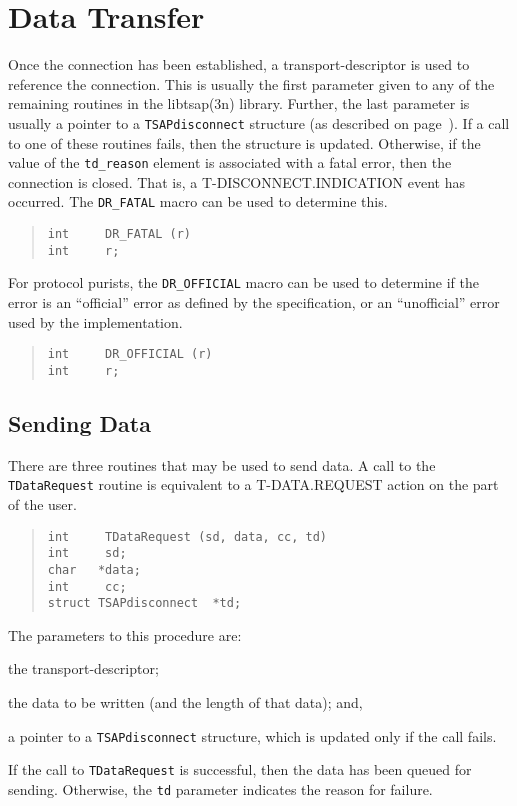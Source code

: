 \section	{Data Transfer}
Once the connection has been established,
a transport-descriptor is used to reference the connection.
This is usually the first parameter given to any of the remaining routines in
the \man libtsap(3n) library.
Further,
the last parameter is usually a pointer to a \verb"TSAPdisconnect" structure
(as described on page~\pageref{TSAPdisconnect}).
If a call to one of these routines fails,
then the structure is updated.
Otherwise, if the value of the \verb"td_reason" element is associated with a
fatal error, then the connection is closed.
That is, a {\sf T-DISCONNECT.INDICATION\/} event has occurred.
The \verb"DR_FATAL" macro can be used to determine this.
\begin{quote}\small\begin{verbatim}
int     DR_FATAL (r)
int     r;
\end{verbatim}\end{quote}
For protocol purists,
the \verb"DR_OFFICIAL" macro can be used to determine if the error is an
``official'' error as defined by the specification,
or an ``unofficial'' error used by the implementation.
\begin{quote}\small\begin{verbatim}
int     DR_OFFICIAL (r)
int     r;
\end{verbatim}\end{quote}

\subsection	{Sending Data}
There are three routines that may be used to send data.
A call to the \verb"TDataRequest" routine is equivalent to a
{\sf T-DATA.REQUEST\/} action on the part of the user.
\begin{quote}\small\begin{verbatim}
int     TDataRequest (sd, data, cc, td)
int     sd;
char   *data;
int     cc;
struct TSAPdisconnect  *td;
\end{verbatim}\end{quote}
The parameters to this procedure are:
\begin{describe}
\item[\verb"sd":] the transport-descriptor;

\item[\verb"data"/\verb"cc":] the data to be written
(and the length of that data);
and,

\item[\verb"td":] a pointer to a \verb"TSAPdisconnect" structure, which is
updated only if the call fails.
\end{describe}
If the call to \verb"TDataRequest" is successful,
then the data has been queued for sending.
Otherwise,
the \verb"td" parameter indicates the reason for failure.

